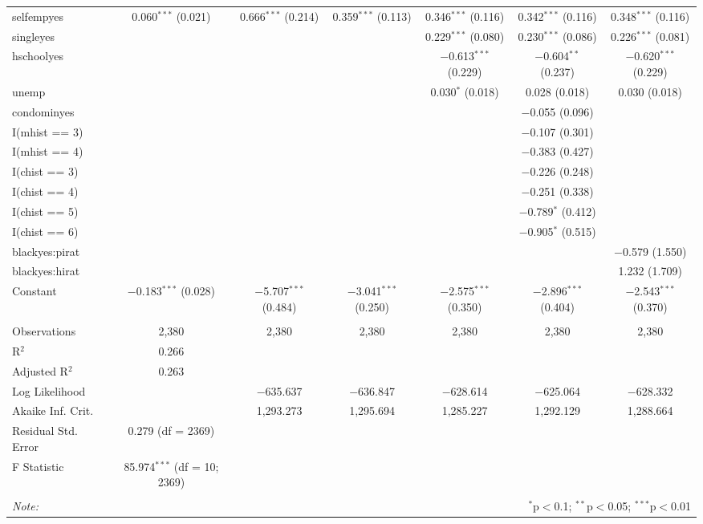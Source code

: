 \documentclass[]{book}
\theoremstyle{definition}
\theoremstyle{definition}
\theoremstyle{definition}
\theoremstyle{remark}
\begin{document}
\begin{table}
\begin{tabular}{@{\extracolsep{-5pt}}lcccccc}
  selfempyes & 0.060$^{***}$ (0.021) & 0.666$^{***}$ (0.214) & 0.359$^{***}$ (0.113) & 0.346$^{***}$ (0.116) & 0.342$^{***}$ (0.116) & 0.348$^{***}$ (0.116) \\ 
  singleyes &  &  &  & 0.229$^{***}$ (0.080) & 0.230$^{***}$ (0.086) & 0.226$^{***}$ (0.081) \\ 
  hschoolyes &  &  &  & $-$0.613$^{***}$ (0.229) & $-$0.604$^{**}$ (0.237) & $-$0.620$^{***}$ (0.229) \\ 
  unemp &  &  &  & 0.030$^{*}$ (0.018) & 0.028 (0.018) & 0.030 (0.018) \\ 
  condominyes &  &  &  &  & $-$0.055 (0.096) &  \\ 
  I(mhist == 3) &  &  &  &  & $-$0.107 (0.301) &  \\ 
  I(mhist == 4) &  &  &  &  & $-$0.383 (0.427) &  \\ 
  I(chist == 3) &  &  &  &  & $-$0.226 (0.248) &  \\ 
  I(chist == 4) &  &  &  &  & $-$0.251 (0.338) &  \\ 
  I(chist == 5) &  &  &  &  & $-$0.789$^{*}$ (0.412) &  \\ 
  I(chist == 6) &  &  &  &  & $-$0.905$^{*}$ (0.515) &  \\ 
  blackyes:pirat &  &  &  &  &  & $-$0.579 (1.550) \\ 
  blackyes:hirat &  &  &  &  &  & 1.232 (1.709) \\ 
  Constant & $-$0.183$^{***}$ (0.028) & $-$5.707$^{***}$ (0.484) & $-$3.041$^{***}$ (0.250) & $-$2.575$^{***}$ (0.350) & $-$2.896$^{***}$ (0.404) & $-$2.543$^{***}$ (0.370) \\ 
 \hline \\[-1.8ex] 
Observations & 2,380 & 2,380 & 2,380 & 2,380 & 2,380 & 2,380 \\ 
R$^{2}$ & 0.266 &  &  &  &  &  \\ 
Adjusted R$^{2}$ & 0.263 &  &  &  &  &  \\ 
Log Likelihood &  & $-$635.637 & $-$636.847 & $-$628.614 & $-$625.064 & $-$628.332 \\ 
Akaike Inf. Crit. &  & 1,293.273 & 1,295.694 & 1,285.227 & 1,292.129 & 1,288.664 \\ 
Residual Std. Error & 0.279 (df = 2369) &  &  &  &  &  \\ 
F Statistic & 85.974$^{***}$ (df = 10; 2369) &  &  &  &  &  \\ 
\hline 
\hline \\[-1.8ex] 
\textit{Note:}  & \multicolumn{6}{r}{$^{*}$p$<$0.1; $^{**}$p$<$0.05; $^{***}$p$<$0.01} \\ 
\end{tabular} 
\end{table}
\end{document}
